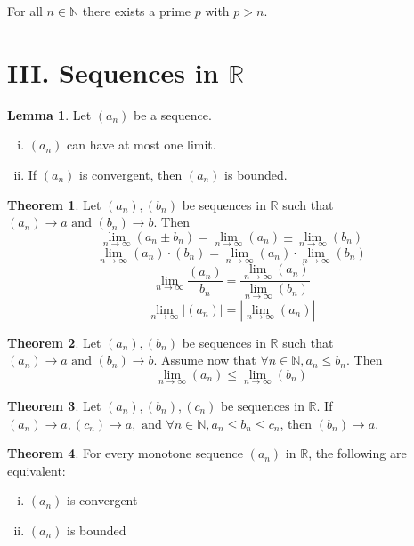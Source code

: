 \documentclass{report}
\theoremstyle{definition}
\begin{document}
\begin{t1}
    For all $ n \in \mathbb{N}  $ there exists a prime $p$ with $p > n$.
\end{t1}

\section*{III. Sequences in $\mathbb{R}$}
\newtheorem*{seqt}{Theorem}
\newtheorem*{seql}{Lemma}
\newtheorem*{seqc}{Corollary}
\newtheorem*{seqp}{Proposition}

\begin{seql} Let $(a_n)$ be a sequence.
    \begin{enumerate}[(i)]
        \item $(a_n)$ can have at most one limit.
        \item If $(a_n)$ is convergent, then $(a_n)$ is bounded.
    \end{enumerate}
\end{seql}

\begin{seqt}
    Let $(a_n), (b_n)$ be sequences in $\mathbb{R}$ such that $(a_n) \rightarrow a \text{ and } (b_n) \rightarrow b$. Then
        \[ \lim_{n\to\infty} (a_n \pm b_n) = \lim_{n\to\infty} (a_n) \pm \lim_{n\to\infty} (b_n)\] 
        \[ \lim_{n\to\infty} (a_n) \cdot (b_n) = \lim_{n\to\infty} (a_n) \cdot \lim_{n\to\infty} (b_n)\]
        \[ \lim_{n\to\infty} \frac{(a_n)}{b_n} = \frac{\lim_{n\to\infty} (a_n)}{\lim_{n\to\infty} (b_n)}\]
        \[ \lim_{n\to\infty} |(a_n)| = |\lim_{n\to\infty} (a_n)|\]
\end{seqt}

\begin{seqt}
    Let $(a_n), (b_n)$ be sequences in $\mathbb{R}$ such that $(a_n) \rightarrow a \text{ and } (b_n) \rightarrow b$. Assume now that
    $\forall n\in\mathbb{N}, a_n\leq b_n.$ Then
    \[ \lim_{n\to\infty} (a_n) \leq \lim_{n\to\infty} (b_n)\]
\end{seqt}

\begin{seqt}
    Let $(a_n), (b_n), (c_n)\text{ be sequences in }\mathbb{R}.$ If $(a_n)\to a, (c_n)\to a, \text{ and } \forall n\in\mathbb{N}, a_n \leq b_n \leq c_n$,
    then $(b_n)\to a$. 
\end{seqt}

\begin{seqt}
    For every monotone sequence $(a_n) \text{ in } \mathbb{R}$, the following are equivalent:
    \begin{enumerate}[(i)]
        \item $(a_n)$ is convergent
        \item $(a_n)$ is bounded
    \end{enumerate}
\end{seqt}
\end{document}
